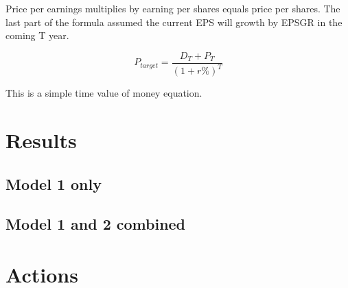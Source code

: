 \documentclass{article}
\begin{document}
Price per earnings multiplies by earning per shares equals price per shares. The last part of the formula assumed the current EPS will growth by EPSGR in the coming T year.

\begin{equation}
P_{target} = \frac{D_T + P_T}{(1+r\%)^T}
\end{equation}

This is a simple time value of money equation.

\section{Results}
\subsection{Model 1 only}

\subsection{Model 1 and 2 combined}

\section{Actions}
\end{document}
